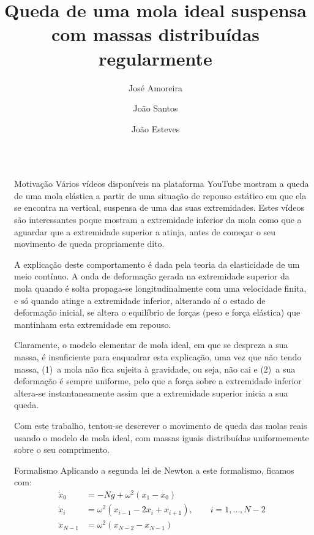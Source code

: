 \documentclass[final]{beamer}
\title{Queda de uma mola ideal suspensa com massas distribuídas regularmente}
\author{José Amoreira \inst{1,2,3} \and João Santos \inst{2} \and João Esteves \inst{2}}
\institute[]{\inst{1} Laboratório de Instrumentação e Física Experimental de Partículas \and  \inst{2}Universidade da Beira Interior  \samelineand \inst{3} Centro de Matemática e Aplicações}
\newlength{\sepwidth}
\newlength{\colwidth}
\newcommand{\separatorcolumn}{\begin{column}{\sepwidth}\end{column}}
\begin{document}
\begin{frame}[t]
\begin{columns}[t]
\separatorcolumn

\begin{column}{\colwidth}

  \begin{exampleblock}{Motivação}
Vários vídeos disponíveis na plataforma YouTube mostram a queda de uma mola
elástica a partir de uma situação de repouso estático em que ela se encontra na
vertical, suspensa de uma das suas extremidades. Estes vídeos são interessantes
poque mostram a extremidade inferior da mola como que a aguardar que a
extremidade superior a atinja, antes de começar o seu movimento de queda
propriamente dito. 

A explicação deste comportamento é dada pela teoria da elasticidade de um meio
contínuo. A onda de deformação gerada na extremidade superior da mola quando é
solta propaga-se longitudinalmente com uma velocidade finita, e só quando atinge
a extremidade inferior, alterando aí o estado de deformação inicial, se altera o
equilíbrio de forças (peso e força elástica) que mantinham esta extremidade em
repouso.

Claramente, o modelo elementar de mola ideal, em que se despreza a sua massa, é
insuficiente para enquadrar esta explicação, uma vez que não tendo massa, (1)~a
mola não fica sujeita à gravidade, ou seja, não cai e (2)~a sua deformação é
sempre uniforme, pelo que a força sobre a extremidade inferior altera-se
instantaneamente assim que a extremidade superior inicia a sua queda. 

Com este trabalho, tentou-se descrever o movimento de queda das molas reais
usando o modelo de mola ideal, com massas iguais distribuídas uniformemente
sobre o seu comprimento.
  \end{exampleblock}
  

\begin{block}{Formalismo}
    Aplicando a segunda lei de Newton a este formalismo, ficamos com:
    \begin{align*}
        \ddot x_0 &=-Ng+\omega^2(x_1-x_0)\\[1cm] 
        \ddot x_i &= \omega^2(x_{i-1}-2x_i+x_{i+1}),\qquad i=1, \ldots, N-2\\[1cm]
         \ddot x_{N-1} &=\omega^2(x_{N-2}-x_{N-1})
    \end{align*}    
\end{block}


\end{column}
\end{columns}
\end{frame}
\end{document}
